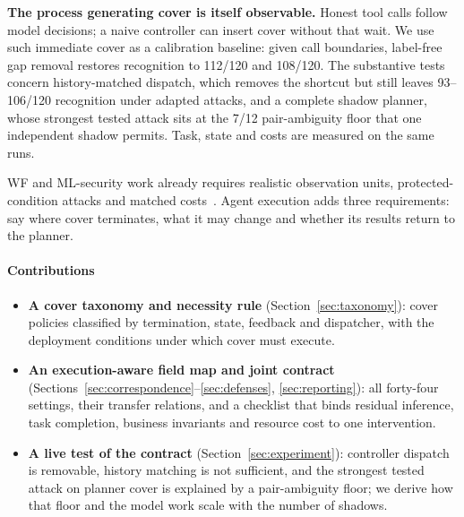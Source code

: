 \textbf{The process generating cover is itself observable.} Honest tool calls follow model decisions; a naive controller can insert cover without that wait. We use such immediate cover as a calibration baseline: given call boundaries, label-free gap removal restores recognition to 112/120 and 108/120. The substantive tests concern history-matched dispatch, which removes the shortcut but still leaves 93--106/120 recognition under adapted attacks, and a complete shadow planner, whose strongest tested attack sits at the 7/12 pair-ambiguity floor that one independent shadow permits. Task, state and costs are measured on the same runs.

WF and ML-security work already requires realistic observation units, protected-condition attacks and matched costs~\cite{juarez2014critical,mathews2023critical,arp2022dos,tramer2020adaptive}. Agent execution adds three requirements: say where cover terminates, what it may change and whether its results return to the planner.

\paragraph{Contributions}
\begin{itemize}
\item \textbf{A cover taxonomy and necessity rule} (Section~\ref{sec:taxonomy}): cover policies classified by termination, state, feedback and dispatcher, with the deployment conditions under which cover must execute.
\item \textbf{An execution-aware field map and joint contract} (Sections~\ref{sec:correspondence}--\ref{sec:defenses}, \ref{sec:reporting}): all forty-four settings, their transfer relations, and a checklist that binds residual inference, task completion, business invariants and resource cost to one intervention.
\item \textbf{A live test of the contract} (Section~\ref{sec:experiment}): controller dispatch is removable, history matching is not sufficient, and the strongest tested attack on planner cover is explained by a pair-ambiguity floor; we derive how that floor and the model work scale with the number of shadows.
\end{itemize}
